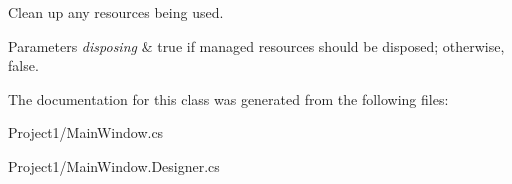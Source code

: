 Clean up any resources being used. 


\begin{DoxyParams}{Parameters}
{\em disposing} & true if managed resources should be disposed; otherwise, false.\\
\hline
\end{DoxyParams}


The documentation for this class was generated from the following files\+:\begin{DoxyCompactItemize}
\item 
Project1/Main\+Window.\+cs\item 
Project1/Main\+Window.\+Designer.\+cs\end{DoxyCompactItemize}
